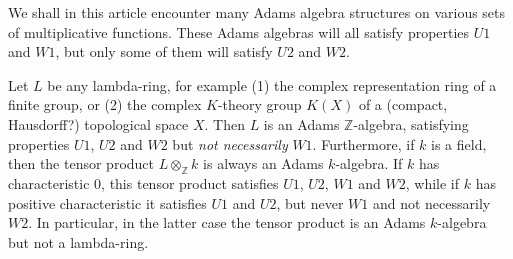 \documentclass[a4paper]{article}
\begin{document}



\begin{remark}
We shall in this article encounter many Adams algebra structures on various sets of multiplicative functions. These Adams algebras will all satisfy properties $U1$ and $W1$, but only some of them will satisfy $U2$ and $W2$.
\end{remark}


\begin{example}
Let $L$ be any lambda-ring, for example (1) the complex representation ring of a finite group, or (2) the complex $K$-theory group $K(X)$ of a (compact, Hausdorff?) topological space $X$. Then $L$ is an Adams $\mathbb{Z}$-algebra, satisfying properties $U1$, $U2$ and $W2$ but \emph{not necessarily} $W1$. Furthermore, if $k$ is a field, then the tensor product $L \otimes_{\mathbb{Z}} k$ is always an Adams $k$-algebra. If $k$ has characteristic 0, this tensor product satisfies $U1$, $U2$, $W1$ and $W2$, while if $k$ has positive characteristic it satisfies $U1$ and $U2$, but never $W1$ and not necessarily $W2$. In particular, in the latter case the tensor product is an Adams $k$-algebra but not a lambda-ring.
\end{example}
\end{document}
